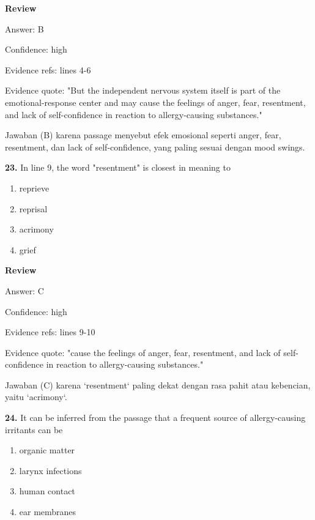 \documentclass[12pt]{article}
\begin{document}
\par
\begingroup
\setlength{\parskip}{0pt}
\setlength{\parindent}{0pt}
\textbf{Review}\par
Answer: B\par
Confidence: high\par
Evidence refs: lines 4-6\par
Evidence quote: "But the independent nervous system itself is part of the emotional-response center and may cause the feelings of anger, fear, resentment, and lack of self-confidence in reaction to allergy-causing substances."\par
Jawaban (B) karena passage menyebut efek emosional seperti anger, fear, resentment, dan lack of self-confidence, yang paling sesuai dengan mood swings.\par
\endgroup
\par
\vspace{0.25\baselineskip}
\noindent\textbf{23.} In line 9, the word "resentment" is closest in meaning to
\begin{enumerate}[label=(\Alph*),leftmargin=*,itemsep=0.2em]
\item reprieve
\item reprisal
\item acrimony
\item grief
\end{enumerate}
\par
\begingroup
\setlength{\parskip}{0pt}
\setlength{\parindent}{0pt}
\textbf{Review}\par
Answer: C\par
Confidence: high\par
Evidence refs: lines 9-10\par
Evidence quote: "cause the feelings of anger, fear, resentment, and lack of self-confidence in reaction to allergy-causing substances."\par
Jawaban (C) karena `resentment` paling dekat dengan rasa pahit atau kebencian, yaitu `acrimony`.\par
\endgroup
\par
\vspace{0.25\baselineskip}
\noindent\textbf{24.} It can be inferred from the passage that a frequent source of allergy-causing irritants can be
\begin{enumerate}[label=(\Alph*),leftmargin=*,itemsep=0.2em]
\item organic matter
\item larynx infections
\item human contact
\item ear membranes
\end{enumerate}
\end{document}
